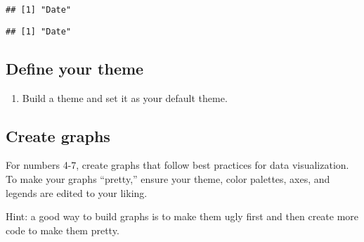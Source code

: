 \documentclass[]{article}
\newenvironment{Shaded}{\begin{snugshade}}{\end{snugshade}}
\newcommand{\KeywordTok}[1]{\textcolor[rgb]{0.13,0.29,0.53}{\textbf{#1}}}
\newcommand{\DataTypeTok}[1]{\textcolor[rgb]{0.13,0.29,0.53}{#1}}
\newcommand{\DecValTok}[1]{\textcolor[rgb]{0.00,0.00,0.81}{#1}}
\newcommand{\StringTok}[1]{\textcolor[rgb]{0.31,0.60,0.02}{#1}}
\newcommand{\CommentTok}[1]{\textcolor[rgb]{0.56,0.35,0.01}{\textit{#1}}}
\newcommand{\OperatorTok}[1]{\textcolor[rgb]{0.81,0.36,0.00}{\textbf{#1}}}
\newcommand{\NormalTok}[1]{#1}
\providecommand{\tightlist}{%
  \setlength{\itemsep}{0pt}\setlength{\parskip}{0pt}}
\begin{document}
\begin{verbatim}
## [1] "Date"
\end{verbatim}

\begin{Shaded}
\end{Shaded}

\begin{verbatim}
## [1] "Date"
\end{verbatim}

\subsection{Define your theme}\label{define-your-theme}

\begin{enumerate}
\def\labelenumi{\arabic{enumi}.}
\setcounter{enumi}{2}
\tightlist
\item
  Build a theme and set it as your default theme.
\end{enumerate}

\begin{Shaded}
\end{Shaded}

\subsection{Create graphs}\label{create-graphs}

For numbers 4-7, create graphs that follow best practices for data
visualization. To make your graphs ``pretty,'' ensure your theme, color
palettes, axes, and legends are edited to your liking.

Hint: a good way to build graphs is to make them ugly first and then
create more code to make them pretty.
\end{document}

